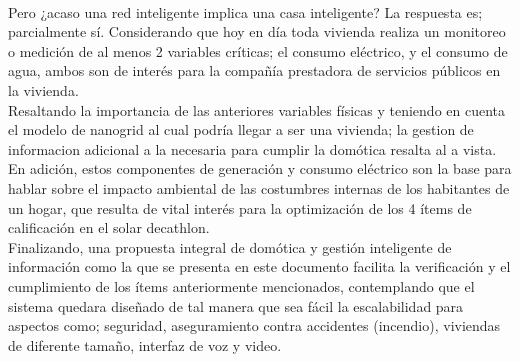 \vspace{0.5cm}\\
Pero ¿acaso una red inteligente implica una casa inteligente? La respuesta es; parcialmente sí. Considerando que hoy en día toda vivienda realiza un monitoreo o medición de al menos 2 variables críticas; el consumo eléctrico, y el consumo de agua, ambos son de interés para la compañía prestadora de servicios públicos en la vivienda.
\vspace{0.5cm}\\
Resaltando la importancia de las anteriores variables físicas y teniendo en cuenta el modelo de nanogrid al cual podría llegar a ser una vivienda; la gestion de informacion adicional a la necesaria para cumplir la domótica resalta al a vista. En adición, estos componentes de generación y consumo eléctrico son la base para hablar sobre el impacto ambiental de las costumbres internas de los habitantes de un hogar, que resulta de vital interés para la optimización de los 4 ítems de calificación en el solar decathlon.
\vspace{0.5cm}\\
Finalizando, una propuesta integral de domótica y gestión inteligente de información como la que se presenta en este documento facilita la verificación y el cumplimiento de los ítems anteriormente mencionados, contemplando que el sistema quedara diseñado de tal manera que sea fácil la escalabilidad para aspectos como; seguridad, aseguramiento contra accidentes (incendio), viviendas de diferente tamaño, interfaz de voz y video.

